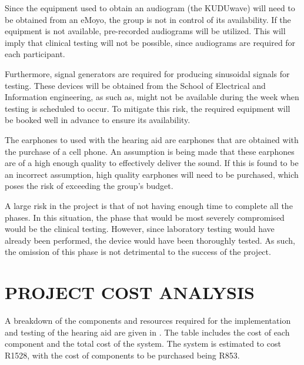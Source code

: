 \documentclass[10pt,twocolumn]{witseiepaper}
\begin{document}
Since the equipment used to obtain an audiogram (the KUDUwave) will need to be obtained from an eMoyo, the group is not in control of its availability. If the equipment is not available, pre-recorded audiograms will be utilized. This will imply that clinical testing will not be possible, since audiograms are required for each participant.

Furthermore, signal generators are required for producing sinusoidal signals for testing. These devices will be obtained from the School of Electrical and Information engineering, as such as, might not be available during the week when testing is scheduled to occur. To mitigate this risk, the required equipment will be booked well in advance to ensure its availability.

The earphones to used with the hearing aid are earphones that are obtained with the purchase of a cell phone. An assumption is being made that these earphones are of a high enough quality to effectively deliver the sound. If this is found to be an incorrect assumption, high quality earphones will need to be purchased, which poses the risk of exceeding the group's budget.

A large risk in the project is that of not having enough time to complete all the phases. In this situation, the phase that would be most severely compromised would be the clinical testing. However, since laboratory testing would have already been performed, the device would have been thoroughly tested. As such, the omission of this phase is not detrimental to the success of the project.

\section{PROJECT COST ANALYSIS}
A breakdown of the components and resources required for the implementation and testing of the hearing aid are given in . The table includes the cost of each component and the total cost of the system. The system is estimated to cost R1528, with the cost of components to be purchased being R853.
\end{document}
